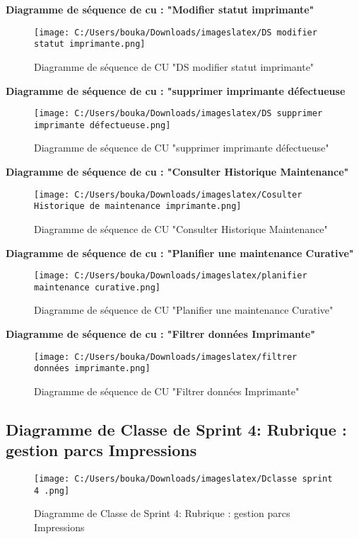 \documentclass[a4paper,11pt]{report}
\begin{document}
\textbf{Diagramme de séquence de cu : "Modifier statut imprimante" }


\begin{figure}[H]
  \centering
  \texttt{[image: C:/Users/bouka/Downloads/imageslatex/DS modifier statut imprimante.png]}
  \caption{Diagramme de séquence de CU "DS modifier statut imprimante"}
  \label{fig:clone-result}
\end{figure}





\textbf{Diagramme de séquence de cu : "supprimer imprimante défectueuse }
\begin{figure}[H]
  \centering
  \texttt{[image: C:/Users/bouka/Downloads/imageslatex/DS supprimer imprimante défectueuse.png]}
  \caption{Diagramme de séquence de CU "supprimer imprimante défectueuse"}
  \label{fig:clone-result}
\end{figure}




\textbf{Diagramme de séquence de cu : "Consulter Historique Maintenance" }
\begin{figure}[H]
  \centering
  \texttt{[image: C:/Users/bouka/Downloads/imageslatex/Cosulter Historique de maintenance imprimante.png]}
  \caption{Diagramme de séquence de CU "Consulter Historique Maintenance"}
  \label{fig:clone-result}
\end{figure}


\textbf{Diagramme de séquence de cu : "Planifier une maintenance Curative" }
\begin{figure}[H]
  \centering
  \texttt{[image: C:/Users/bouka/Downloads/imageslatex/planifier maintenance curative.png]}
  \caption{Diagramme de séquence de CU "Planifier une maintenance Curative"}
  \label{fig:clone-result}
\end{figure}



\textbf{Diagramme de séquence de cu : "Filtrer données Imprimante" }
\begin{figure}[H]
  \centering
  \texttt{[image: C:/Users/bouka/Downloads/imageslatex/filtrer données imprimante.png]}
  \caption{Diagramme de séquence de CU "Filtrer données Imprimante"}
  \label{fig:clone-result}
\end{figure}


\newpage
\subsection{Diagramme de Classe de Sprint 4: Rubrique : gestion parcs Impressions}


\begin{figure}[H]
  \centering
  \texttt{[image: C:/Users/bouka/Downloads/imageslatex/Dclasse sprint 4 .png]}
  \caption{Diagramme de Classe de Sprint 4: Rubrique : gestion parcs Impressions}
  \label{fig:clone-result}
\end{figure}
\end{document}
